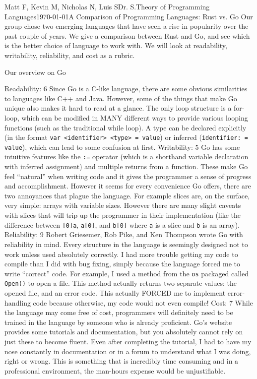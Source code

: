 \documentclass[12pt,letterpaper]{article}
\begin{document}
\begin{mla}{Matt F, Kevin M, Nicholas N, Luis S}{}{Dr. S.}{Theory of Programming Languages}{\today}{A Comparison of Programming Languages: Rust vs. Go}
    Our group chose two emerging languages that have seen a rise in popularity over the past couple of years. We give a comparison between Rust and Go, and see which is the better choice of language to work with. We will look at readability, writability, reliability, and cost as a rubric. 

      Our overview on Go
      
Readability: 6
	Since Go is a C-like language, there are some obvious similarities to languages like C++ and Java. However, some of the things that make Go unique also makes it hard to read at a glance. The only loop structure is a for-loop, which can be modified in MANY different ways to provide various looping functions (such as the traditional while loop). A type can be declared explicitly (in the format \texttt{var <identifier> <type> = value}) or inferred (\texttt{identifier: = value}), which can lead to some confusion at first.
Writability: 5
	Go has some intuitive features like the \texttt{:=} operator (which is a shorthand variable declaration with inferred assignment) and multiple returns from a function. These make Go feel ``natural'' when writing code and it gives the programmer a sense of progress and accomplishment.
	However it seems for every convenience Go offers, there are two annoyances that plague the language. For example slices are, on the surface, very simple: arrays with variable sizes. However there are many slight caveats with slices that will trip up the programmer in their implementation (like the difference between \texttt{[0]a}, \texttt{a[0]}, and \texttt{b[0]} where \texttt{a} is a slice and \texttt{b} is an array).
Reliability: 9
	 Robert Griesemer, Rob Pike, and Ken Thompson wrote Go with reliability in mind. Every structure in the language is seemingly designed not to work unless used absolutely correctly. I had more trouble getting my code to compile than I did with bug fixing, simply because the language forced me to write ``correct'' code. For example, I used a method from the \texttt{os} packaged called \texttt{Open()} to open a file. This method actually returns two separate values: the opened file, and an error code. This actually FORCED me to implement error-handling code because otherwise, my code would not even compile!
Cost: 7
	While the language may come free of cost, programmers will definitely need to be trained in the language by someone who is already proficient. Go's website provides some tutorials and documentation, but you absolutely cannot rely on just these to become fluent. Even after completing the tutorial, I had to have my nose constantly in documentation or in a forum to understand what I was doing, right or wrong. This is something that is incredibly time consuming and in a professional environment, the man-hours expense would be unjustifiable.


\end{mla}
\end{document}
